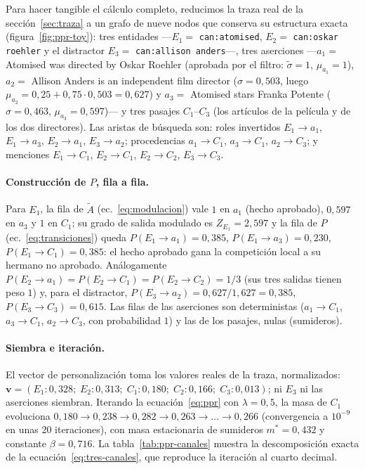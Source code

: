 \documentclass[11pt,a4paper]{article}
\begin{document}
Para hacer tangible el cálculo completo, reducimos la traza real de la
sección~\ref{sec:traza} a un grafo de nueve nodos que conserva su
estructura exacta (figura~\ref{fig:ppr-toy}): tres entidades
---$E_1=$ \texttt{can:atomised}, $E_2=$ \texttt{can:oskar roehler} y el
distractor $E_3=$ \texttt{can:allison anders}---, tres aserciones
---$a_1=$ \guillemotleft{}Atomised was directed by Oskar Roehler\guillemotright{} (aprobada por el
filtro: $\tilde\sigma=1$, $\mu_{a_1}=1$), $a_2=$ \guillemotleft{}Allison Anders is an
independent film director\guillemotright{} ($\sigma=0{,}503$, luego
$\mu_{a_2}=0{,}25+0{,}75\cdot 0{,}503=0{,}627$) y $a_3=$ \guillemotleft{}Atomised stars
Franka Potente\guillemotright{} ($\sigma=0{,}463$, $\mu_{a_3}=0{,}597$)--- y tres pasajes
$C_1$--$C_3$ (los artículos de la película y de los dos directores). Las
aristas de búsqueda son: roles invertidos $E_1\to a_1$, $E_1\to a_3$,
$E_2\to a_1$, $E_3\to a_2$; procedencias $a_1\to C_1$, $a_3\to C_1$,
$a_2\to C_3$; y menciones $E_1\to C_1$, $E_2\to C_1$, $E_2\to C_2$,
$E_3\to C_3$.

\paragraph{Construcción de $P$, fila a fila.}
Para $E_1$, la fila de $\tilde A$ (ec.~\ref{eq:modulacion}) vale $1$ en
$a_1$ (hecho aprobado), $0{,}597$ en $a_3$ y $1$ en $C_1$; su grado de
salida modulado es $Z_{E_1}=2{,}597$ y la fila de $P$
(ec.~\ref{eq:transiciones}) queda $P(E_1\!\to\!a_1)=0{,}385$,
$P(E_1\!\to\!a_3)=0{,}230$, $P(E_1\!\to\!C_1)=0{,}385$: el hecho aprobado
gana la competición local a su hermano no aprobado. Análogamente
$P(E_2\!\to\!a_1)=P(E_2\!\to\!C_1)=P(E_2\!\to\!C_2)=1/3$
(sus tres salidas tienen peso $1$) y, para el distractor,
$P(E_3\!\to\!a_2)=0{,}627/1{,}627=0{,}385$,
$P(E_3\!\to\!C_3)=0{,}615$. Las filas de las aserciones son
deterministas ($a_1\to C_1$, $a_3\to C_1$, $a_2\to C_3$, con probabilidad
$1$) y las de los pasajes, nulas (sumideros).

\paragraph{Siembra e iteración.}
El vector de personalización toma los valores reales de la traza,
normalizados: $\mathbf{v} = (E_1\!:0{,}328;\; E_2\!:0{,}313;\;
C_1\!:0{,}180;\; C_2\!:0{,}166;\; C_3\!:0{,}013)$; ni $E_3$ ni las
aserciones siembran. Iterando la ecuación~\eqref{eq:ppr} con
$\lambda=0{,}5$, la masa de $C_1$ evoluciona
$0{,}180 \to 0{,}238 \to 0{,}282 \to 0{,}263 \to \dots \to 0{,}266$
(convergencia a $10^{-9}$ en unas 20 iteraciones), con masa estacionaria
de sumideros $m^{*}=0{,}432$ y constante $\beta = 0{,}716$. La
tabla~\ref{tab:ppr-canales} muestra la descomposición exacta de la
ecuación~\eqref{eq:tres-canales}, que reproduce la iteración al cuarto
decimal.
\end{document}
